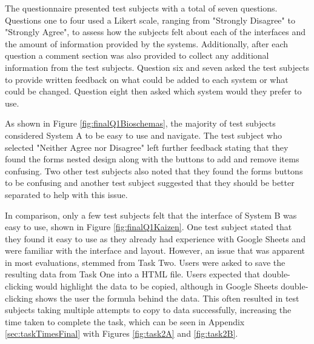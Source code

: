 \newpage

The questionnaire presented test subjects with a total of seven questions. Questions one to four used a Likert scale, ranging from "Strongly Disagree" to "Strongly Agree", to assess how the subjects felt about each of the interfaces and the amount of information provided by the systems. Additionally, after each question a comment section was also provided to collect any additional information from the test subjects. Question six and seven asked the test subjects to provide written feedback on what could be added to each system or what could be changed. Question eight then asked which system would they prefer to use.

As shown in Figure \ref{fig:finalQ1Bioschemas}, the majority of test subjects considered System A to be easy to use and navigate. The test subject who selected "Neither Agree nor Disagree" left further feedback stating that they found the forms nested design along with the buttons to add and remove items confusing. Two other test subjects also noted that they found the forms buttons to be confusing and another test subject suggested that they should be better separated to help with this issue.

In comparison, only a few test subjects felt that the interface of System B was easy to use, shown in Figure \ref{fig:finalQ1Kaizen}. One test subject stated that they found it easy to use as they already had experience with Google Sheets and were familiar with the interface and layout. However, an issue that was apparent in most evaluations, stemmed from Task Two. Users were asked to save the resulting data from Task One into a HTML file. Users expected that double-clicking would highlight the data to be copied, although in Google Sheets double-clicking shows the user the formula behind the data. This often resulted in test subjects taking multiple attempts to copy to data successfully, increasing the time taken to complete the task, which can be seen in Appendix \ref{sec:taskTimesFinal} with Figures \ref{fig:task2A} and \ref{fig:task2B}.\newline

